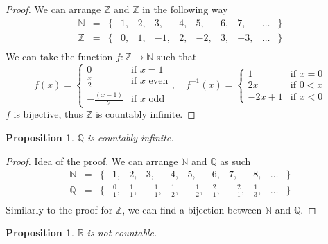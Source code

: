 \documentclass{article}
\newcommand{\bb}[1]{\mathbb{#1}}
\newcommand{\fr}[2]{\frac{#1}{#2}}
\newcommand{\fToN}[2]{#1 : #2 \rightarrow \mathbb{N}}
\theoremstyle{definition}
\theoremstyle{definition}
\theoremstyle{plain}
\theoremstyle{plain}
\theoremstyle{plain}
\theoremstyle{plain}
\newtheorem{proposition}[theorem]{Proposition}
\theoremstyle{definition}
\theoremstyle{remark}
\theoremstyle{remark}
\theoremstyle{remark}
\theoremstyle{remark}
\newcommand{\N}{\mathbb{N}}
\newcommand{\Z}{\mathbb{Z}}
\newcommand{\Q}{\mathbb{Q}}
\newcommand{\R}{\mathbb{R}}
\begin{document}
\begin{proof}
  We can arrange $\Z$ and $\Z$ in the following way
  \[
  \begin{array}{lcrccccccccl}
    \bb{N} & = & \{ & 1, & 2, & 3, & 4, & 5, & 6, & 7, & \hdots & \} \\
    \bb{Z} & = & \{ & 0, & 1, & -1,& 2, & -2,& 3, & -3,& \hdots & \} \\
  \end{array}
  \]
  We can take the function $\fToN{f}{\Z}$ such that
  \[
  f(x) = \begin{cases}
    0 & \text{if } x = 1 \\
    \fr{x}{2} & \text{if } x \text{ even} \\
    -\fr{(x - 1)}{2} & \text{if } x \text{ odd}
  \end{cases}, \quad
  f^{-1}(x) = \begin{cases}
    1 & \text{if } x = 0 \\
    2x & \text{if } 0 < x \\
    -2x+1 & \text{if } x < 0
  \end{cases}
  \]
  $f$ is bijective, thus $\Z$ is countably infinite.
\end{proof}


\begin{proposition}
  $\Q$ is countably infinite.
\end{proposition}

\begin{proof}
  Idea of the proof. We can arrange $\N$ and $\Q$ as such
  \[
  \begin{array}{lcrcccccccccl}
    \bb{N} & = & \{ & 1,         & 2,         & 3,          & 4,         & 5,          & 6,         & 7,          & 8,         & \hdots & \} \\
    \bb{Q} & = & \{ & \fr{0}{1}, & \fr{1}{1}, & -\fr{1}{1}, & \fr{1}{2}, & -\fr{1}{2}, & \fr{2}{1}, & -\fr{2}{1}, & \fr{1}{3}, & \hdots & \} \\
  \end{array}
  \]
  Similarly to the proof for $\Z$, we can find a bijection between $\N$ and $\Q$.
\end{proof}


\begin{proposition}
  $\R$ is not countable.
\end{proposition}
\end{document}
